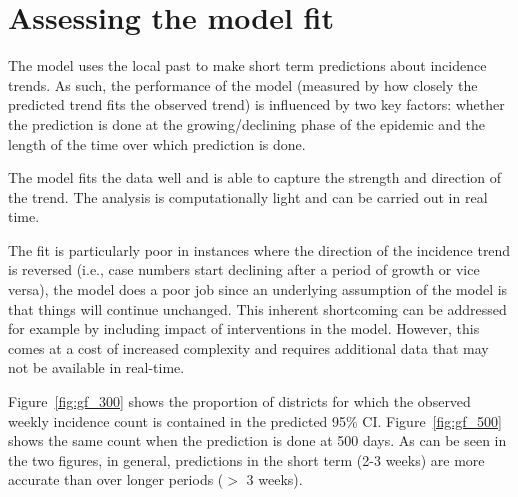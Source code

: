 \documentclass[a4paper,12pt]{article}
\begin{document}
\section{Assessing the model fit}
The model uses the local past to make short term predictions about
incidence trends. As such, the performance of the model (measured
by how closely the predicted trend fits the observed trend) is
influenced by two key factors: whether the prediction is done at the
growing/declining phase of the epidemic and the length of the time
over which prediction is done.

The model fits the data well and is able to capture the strength
and direction of the trend. The analysis is computationally light
and can be carried out in real time.

The fit is particularly poor in instances where the direction of the incidence trend is reversed (i.e., case numbers start declining after a period of growth or vice versa), the model does a poor job since an underlying assumption of the model is that things will continue unchanged. This inherent shortcoming can be addressed for example by including impact of interventions in the model. However, this comes at a cost of increased complexity and requires additional data that may not be available in real-time.

Figure~\ref{fig:gf_300} shows the proportion of districts for which the
observed weekly incidence count is contained in the predicted 95\%
CI. Figure~\ref{fig:gf_500} shows the same count when the prediction
is done at 500 days. As can be seen in the two figures, in general, predictions in the short
term (2-3 weeks) are more accurate than over longer periods ($>$ 3
weeks).
\end{document}
